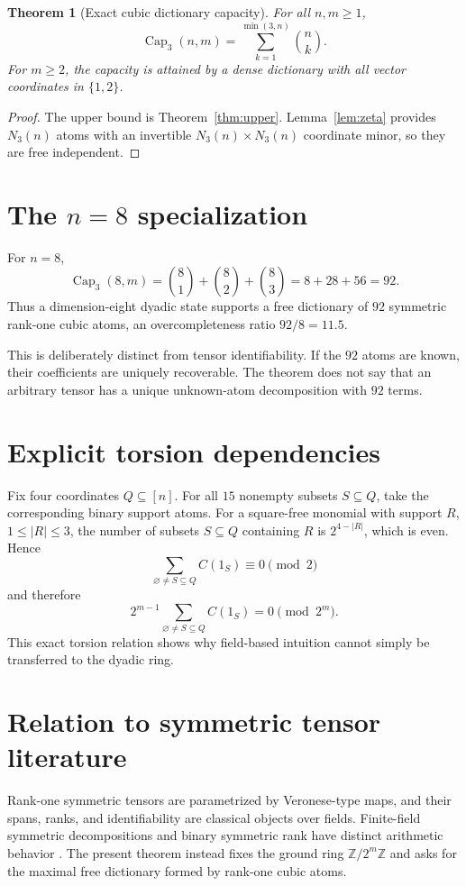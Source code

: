 \documentclass[11pt]{article}
\newtheorem{theorem}{Theorem}
\theoremstyle{definition}
\newcommand{\Z}{\mathbb Z}
\newcommand{\CubCap}{\operatorname{Cap}}
\begin{document}
\begin{theorem}[Exact cubic dictionary capacity]\label{thm:capacity}
For all \(n,m\ge1\),
\[
\boxed{\displaystyle
\CubCap_3(n,m)=\sum_{k=1}^{\min(3,n)}\binom nk.}
\]
For \(m\ge2\), the capacity is attained by a dense dictionary with all vector coordinates in \(\{1,2\}\).
\end{theorem}

\begin{proof}
The upper bound is Theorem~\ref{thm:upper}. Lemma~\ref{lem:zeta} provides \(N_3(n)\) atoms with an invertible \(N_3(n)\times N_3(n)\) coordinate minor, so they are free independent.
\end{proof}

\section{The \(n=8\) specialization}
For \(n=8\),
\[
\CubCap_3(8,m)=\binom81+\binom82+\binom83
=8+28+56
=92.
\]
Thus a dimension-eight dyadic state supports a free dictionary of \(92\) symmetric rank-one cubic atoms, an overcompleteness ratio \(92/8=11.5\).

This is deliberately distinct from tensor identifiability. If the \(92\) atoms are known, their coefficients are uniquely recoverable. The theorem does not say that an arbitrary tensor has a unique unknown-atom decomposition with \(92\) terms.

\section{Explicit torsion dependencies}
Fix four coordinates \(Q\subseteq[n]\). For all \(15\) nonempty subsets \(S\subseteq Q\), take the corresponding binary support atoms. For a square-free monomial with support \(R\), \(1\le|R|\le3\), the number of subsets \(S\subseteq Q\) containing \(R\) is \(2^{4-|R|}\), which is even. Hence
\[
\sum_{\varnothing\ne S\subseteq Q}C(1_S)\equiv0\pmod2
\]
and therefore
\[
2^{m-1}\sum_{\varnothing\ne S\subseteq Q}C(1_S)=0\pmod{2^m}.
\]
This exact torsion relation shows why field-based intuition cannot simply be transferred to the dyadic ring.

\section{Relation to symmetric tensor literature}
Rank-one symmetric tensors are parametrized by Veronese-type maps, and their spans, ranks, and identifiability are classical objects over fields. Finite-field symmetric decompositions and binary symmetric rank have distinct arithmetic behavior \cite{SongZhengHuang2022,CotardoZullo2026}. The present theorem instead fixes the ground ring \(\Z/2^m\Z\) and asks for the maximal free dictionary formed by rank-one cubic atoms.
\end{document}
